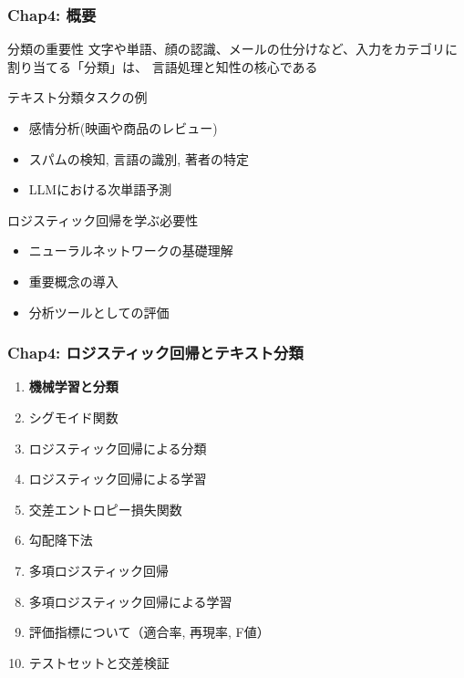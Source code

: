 \documentclass[unicode,11pt]{beamer} %
\begin{document}
\begin{frame}
    \frametitle{Chap4: 概要}

    \begin{alertblock}{分類の重要性}
        文字や単語、顔の認識、メールの仕分けなど、入力をカテゴリに割り当てる「分類」は、
        言語処理と知性の核心である
    \end{alertblock}

    \begin{exampleblock}{テキスト分類タスクの例}
        \begin{itemize}
            \item 感情分析(映画や商品のレビュー) 
            \item スパムの検知, 言語の識別, 著者の特定
            \item LLMにおける次単語予測
        \end{itemize}
    \end{exampleblock}
    \begin{alertblock}{ロジスティック回帰を学ぶ必要性}
        \begin{itemize}
            \item ニューラルネットワークの基礎理解
            \item 重要概念の導入
            \item 分析ツールとしての評価
        \end{itemize}
    \end{alertblock}
\end{frame}


\begin{frame}
    \frametitle{Chap4: ロジスティック回帰とテキスト分類}
    \begin{block}{}
        \begin{enumerate}
            \item {\color{red}\textbf{機械学習と分類}}
            \item シグモイド関数
            \item ロジスティック回帰による分類
            \item ロジスティック回帰による学習
            \item 交差エントロピー損失関数
            \item 勾配降下法
            \item 多項ロジスティック回帰
            \item 多項ロジスティック回帰による学習
            \item 評価指標について（適合率, 再現率, F値）
            \item テストセットと交差検証
        \end{enumerate}
    \end{block}
\end{frame}
\end{document}
